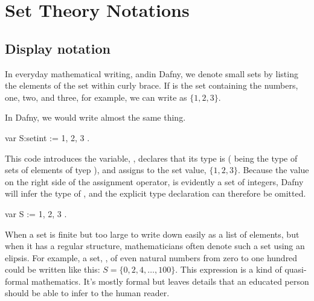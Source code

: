 \documentclass[letterpaper,10pt,english]{sphinxmanual}
\begin{document}
\section{Set Theory Notations}
\label{\detokenize{07-set-theory:set-theory-notations}}

\subsection{Display notation}
\label{\detokenize{07-set-theory:display-notation}}
In everyday mathematical writing, andin Dafny, we denote small sets by
listing the elements of the set within curly brace. If  is the set
containing the numbers, one, two, and three, for example, we can write
 as \(\{ 1, 2, 3 \}.\)

In Dafny, we would write almost the same thing.

\begin{sphinxVerbatim}[commandchars=\\\{\}]
var S:set\PYGZlt{}int\PYGZgt{} := \PYGZob{} 1, 2, 3 \PYGZcb{}.
\end{sphinxVerbatim}

This code introduces the variable, , declares that its type is
 ( being the type of  sets
of elements of tyep ), and assigns to  the set value, \(\{
1, 2, 3 \}.\) Because the value on the right side of the assignment
operator, is evidently a set of integers, Dafny will infer the type of
, and the explicit type declaration can therefore be omitted.

\begin{sphinxVerbatim}[commandchars=\\\{\}]
var S := \PYGZob{} 1, 2, 3 \PYGZcb{}.
\end{sphinxVerbatim}

When a set is finite but too large to write down easily as a list of
elements, but when it has a regular structure, mathematicians often
denote such a set using an elipsis. For example, a set, , of even
natural numbers from zero to one hundred could be written like this:
\(S = \{ 0, 2, 4, \ldots, 100 \}.\) This expression is a kind of
quasi-formal mathematics. It’s mostly formal but leaves details that
an educated person should be able to infer to the human reader.
\end{document}
